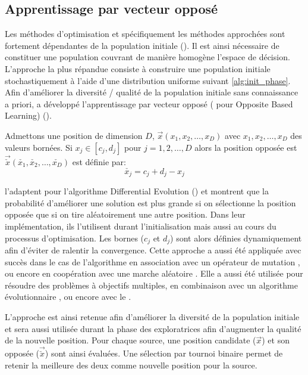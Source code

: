 \subsection{Apprentissage par vecteur opposé} %
\label{sub:apprentissage_par_vecteur_oppose}
Les méthodes d’optimisation et spécifiquement les méthodes approchées sont fortement
dépendantes de la population initiale (). Il est ainsi nécessaire
de constituer une population couvrant de manière homogène l’espace de décision.
L’approche la plus répandue consiste à construire une population initiale stochastiquement
à l’aide d’une distribution uniforme suivant \eqref{alg:init_phase}.
Afin d’améliorer la diversité / qualité de la population initiale sans connaissance
a priori, \textcite{Tizhoosh2005695} a développé l’apprentissage par vecteur opposé
( pour Opposite Based Learning) ().

\begin{Def}\label{def:oblm}
Admettons une position de dimension $D$, $\vec{x}(x_{1}, x_{2}, \dotsc, x_{D})$ avec
$x_{1}, x_{2}, \dotsc, x_{D}$ des valeurs bornées. Si $x_{j} \in [c_{j}, d_{j}]$ pour
$j = 1, 2, \dotsc, D$ alors la position opposée est $\vec{\check{x}}(\check{x_{1}},%
\check{x_{2}}, \dotsc, \check{x_{D}})$ est définie par:
\[\check{x_{j}} = c_{j} + d_{j} - x_{j}\]
\end{Def}

\textcite{Rahnamayan2008906} l’adaptent pour l’algorithme Differential Evolution ()
et montrent que la probabilité d’améliorer une solution est plus grande si on sélectionne
la position opposée que si on tire aléatoirement une autre position.
Dans leur implémentation, ils l’utilisent durant l’initialisation mais aussi au cours du
processus d’optimisation. Les bornes ($c_{j}$ et $d_{j}$) sont alors définies dynamiquement
afin d’éviter de ralentir la convergence.
Cette approche a aussi été appliquée avec succès dans le cas de l’algorithme 
en association avec un opérateur de mutation \parencite{Bi2011174}, ou encore en coopération
avec une marche aléatoire \parencite{Sharma2012213}. Elle a aussi été utilisée pour
résoudre des problèmes à objectifs multiples, en combinaison avec un algorithme
évolutionnaire \parencite{Ma201448}, ou encore avec le  \parencite{Gao2013114}.

L’approche est ainsi retenue afin d’améliorer la diversité de la population initiale
et sera aussi utilisée durant la phase des exploratrices afin d’augmenter la qualité
de la nouvelle position.
Pour chaque source, une position candidate ($\vec{x}$) et son opposée
($\vec{\check{x}}$) sont ainsi évaluées. Une sélection par tournoi binaire permet
de retenir la meilleure des deux comme nouvelle position pour la source.


